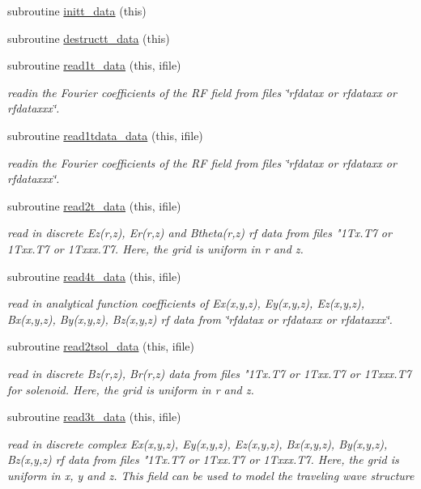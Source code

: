 \begin{DoxyCompactItemize}
subroutine \mbox{\hyperlink{namespacedataclass_a97d261734f3a864b94d895a3d2ac2317}{initt\+\_\+data}} (this)
\item 
subroutine \mbox{\hyperlink{namespacedataclass_aa6d6d0d2beefc01e5873047a3c78f073}{destructt\+\_\+data}} (this)
\item 
subroutine \mbox{\hyperlink{namespacedataclass_a8a4f016b0eeea3567fb59c4100c5cdc5}{read1t\+\_\+data}} (this, ifile)
\begin{DoxyCompactList}\small\item\em readin the Fourier coefficients of the RF field from files \char`\"{}rfdatax or rfdataxx or rfdataxxx\char`\"{}. \end{DoxyCompactList}\item 
subroutine \mbox{\hyperlink{namespacedataclass_a5167a50ad979e317b65f07bf468212d8}{read1tdata\+\_\+data}} (this, ifile)
\begin{DoxyCompactList}\small\item\em readin the Fourier coefficients of the RF field from files \char`\"{}rfdatax or rfdataxx or rfdataxxx\char`\"{}. \end{DoxyCompactList}\item 
subroutine \mbox{\hyperlink{namespacedataclass_a6a03d5b21b9316f6fd4053aeb7acb426}{read2t\+\_\+data}} (this, ifile)
\begin{DoxyCompactList}\small\item\em read in discrete Ez(r,z), Er(r,z) and Btheta(r,z) rf data from files "1\+Tx.\+T7 or 1\+Txx.\+T7 or 1\+Txxx.\+T7. Here, the grid is uniform in r and z. \end{DoxyCompactList}\item 
subroutine \mbox{\hyperlink{namespacedataclass_a8159006c3a211e35e4c3e22d94b2abc6}{read4t\+\_\+data}} (this, ifile)
\begin{DoxyCompactList}\small\item\em read in analytical function coefficients of Ex(x,y,z), Ey(x,y,z), Ez(x,y,z), Bx(x,y,z), By(x,y,z), Bz(x,y,z) rf data from \char`\"{}rfdatax or rfdataxx or rfdataxxx\char`\"{}. \end{DoxyCompactList}\item 
subroutine \mbox{\hyperlink{namespacedataclass_af6df6f58c6c53c92a78e3d512d6a4d03}{read2tsol\+\_\+data}} (this, ifile)
\begin{DoxyCompactList}\small\item\em read in discrete Bz(r,z), Br(r,z) data from files "1\+Tx.\+T7 or 1\+Txx.\+T7 or 1\+Txxx.\+T7 for solenoid. Here, the grid is uniform in r and z. \end{DoxyCompactList}\item 
subroutine \mbox{\hyperlink{namespacedataclass_a44430d1d47a985d35f3544c9b7dac562}{read3t\+\_\+data}} (this, ifile)
\begin{DoxyCompactList}\small\item\em read in discrete complex Ex(x,y,z), Ey(x,y,z), Ez(x,y,z), Bx(x,y,z), By(x,y,z), Bz(x,y,z) rf data from files "1\+Tx.\+T7 or 1\+Txx.\+T7 or 1\+Txxx.\+T7. Here, the grid is uniform in x, y and z. This field can be used to model the traveling wave structure \end{DoxyCompactList}\end{DoxyCompactItemize}
